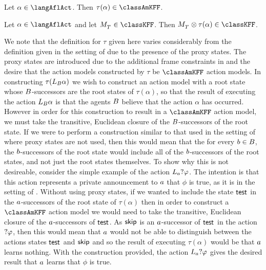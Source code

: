 \begin{lemma}\label{afl-kff-structure}
    Let $\alpha \in \langAflAct$. Then $\tau(\alpha) \in \classAmKFF$.
\end{lemma}

\begin{lemma}\label{afl-kff-exec}
    Let $\alpha \in \langAflAct$ and let $\kPModel{\kStatesT} \in \classKFF$.
    Then $\kPModel{\kStatesT} \exec \tau(\alpha) \in \classKFF$.
\end{lemma}

We note that the definition for $\tau$ given here varies considerably from the definition given in the setting of \classK{} due to the presence of the proxy states.
The proxy states are introduced due to the additional frame constraints in \classKFF{} and the desire that the action models constructed by $\tau$ be $\classAmKFF$ action models.
In constructing $\tau(L_B \alpha)$ we wish to construct an action model with a root state whose $B$-successors are the root states of $\tau(\alpha)$, so that the result of executing the action $L_B \alpha$ is that the agents $B$ believe that the action $\alpha$ has occurred.
However in order for this construction to result in a $\classAmKFF$ action model, we must take the transitive, Euclidean closure of the $B$-successors of the root state.
If we were to perform a construction similar to that used in the setting of \classK{} where proxy states are not used, then this would mean that the for every $b \in B$, the $b$-successors of the root state would include all of the $b$-successors of the root states, and not just the root states themselves.
To show why this is not desireable, consider the simple example of the action $L_a ?{\varphi}$.
The intention is that this action represents a private announcement to $a$ that $\phi$ is true, as it is in the setting of \classK{}.
Without using proxy states, if we wanted to include the state $\aStateTest$ in the $a$-successors of the root state of $\tau(\alpha)$ then in order to construct a $\classAmKFF$ action model we would need to take the transitive, Euclidean closure of the $a$-successors of $\aStateTest$.
As $\aStateSkip$ is an $a$-successor of $\aStateTest$ in the action $?{\varphi}$, then this would mean that $a$ would not be able to distinguish between the actions states $\aStateTest$ and $\aStateSkip$ and so the result of executing $\tau(\alpha)$ would be that $a$ learns nothing.
With the construction provided, the action $L_a ?{\varphi}$ gives the desired result that $a$ learns that $\phi$ is true.

